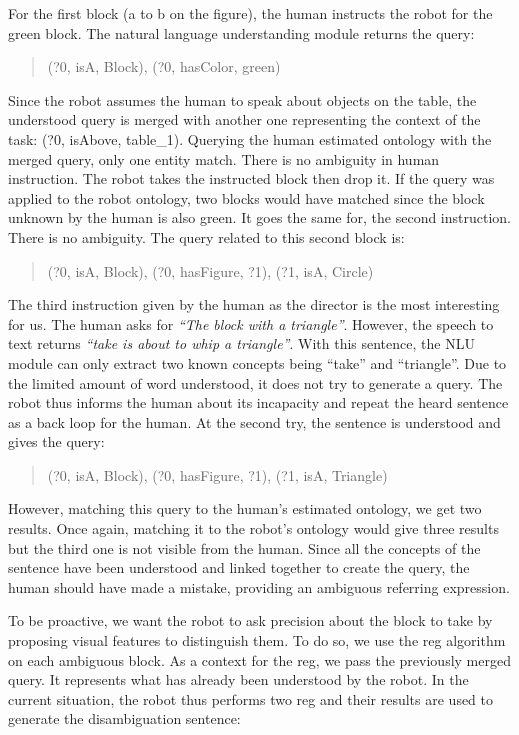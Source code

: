 For the first block (a to b on the figure), the human instructs the robot for the green block. The natural language understanding module returns the \sparql{} query:

\begin{quote} 
\centering 
(?0, isA, Block), (?0, hasColor, green)
\end{quote}

Since the robot assumes the human to speak about objects on the table, the understood query is merged with another one representing the context of the task: (?0, isAbove, table\_1). Querying the human estimated ontology with the merged query, only one entity match. There is no ambiguity in human instruction. The robot takes the instructed block then drop it. If the query was applied to the robot ontology, two blocks would have matched since the block unknown by the human is also green. It goes the same for, the second instruction. There is no ambiguity. The \sparql{} query related to this second block is:

\begin{quote} 
\centering 
(?0, isA, Block), (?0, hasFigure, ?1), (?1, isA, Circle)
\end{quote}

The third instruction given by the human as the director is the most interesting for us. The human asks for \textit{``The block with a triangle''}. However, the speech to text returns \textit{``take is about to whip a triangle''}. With this sentence, the NLU module can only extract two known concepts being ``take'' and ``triangle''. Due to the limited amount of word understood, it does not try to generate a \sparql{} query. The robot thus informs the human about its incapacity and repeat the heard sentence as a back loop for the human. At the second try, the sentence is understood and gives the query:

\begin{quote} 
\centering 
(?0, isA, Block), (?0, hasFigure, ?1), (?1, isA, Triangle)
\end{quote}

However, matching this query to the human's estimated ontology, we get two results. Once again, matching it to the robot's ontology would give three results but the third one is not visible from the human. Since all the concepts of the sentence have been understood and linked together to create the query, the human should have made a mistake, providing an ambiguous referring expression.

To be proactive, we want the robot to ask precision about the block to take by proposing visual features to distinguish them. To do so, we use the \acrshort{reg} algorithm on each ambiguous block. As a context for the \acrshort{reg}, we pass the previously merged \sparql{} query. It represents what has already been understood by the robot. In the current situation, the robot thus performs two \acrshort{reg} and their results are used to generate the disambiguation sentence:

